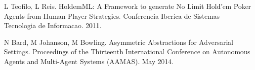 \documentclass[twoside]{article}
\begin{document}
\begin{multicols}{2}
\begin{thebibliography}{99}
 L Teofilo, L Reis. HoldemML: A Framework to generate No Limit Hold’em Poker Agents from Human Player Strategies. Conferencia Iberica de Sistemas Tecnologia de Informacao. 2011.

 N Bard, M Johanson, M Bowling. Asymmetric Abstractions for Adversarial Settings. Proceedings of the Thirteenth International Conference on Autonomous Agents and Multi-Agent Systems (AAMAS). May 2014.
\end{thebibliography}


\end{multicols}
\end{document}
